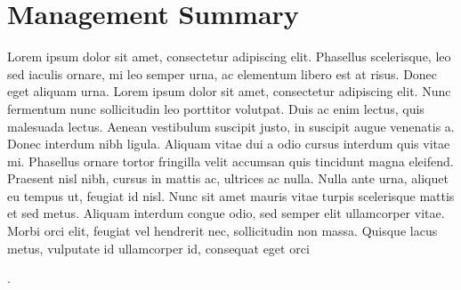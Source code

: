 \chapter*{Management Summary}
\label{chap:managementSummary}

Lorem ipsum dolor sit amet, consectetur adipiscing elit. Phasellus scelerisque, leo sed iaculis ornare, mi leo semper urna, ac elementum libero est at risus. Donec eget aliquam urna. Lorem ipsum dolor sit amet, consectetur adipiscing elit. Nunc fermentum nunc sollicitudin leo porttitor volutpat. Duis ac enim lectus, quis malesuada lectus. Aenean vestibulum suscipit justo, in suscipit augue venenatis a. Donec interdum nibh ligula. Aliquam vitae dui a odio cursus interdum quis vitae mi. Phasellus ornare tortor fringilla velit accumsan quis tincidunt magna eleifend. Praesent nisl nibh, cursus in mattis ac, ultrices ac nulla. Nulla ante urna, aliquet eu tempus ut, feugiat id nisl. Nunc sit amet mauris vitae turpis scelerisque mattis et sed metus. Aliquam interdum congue odio, sed semper elit ullamcorper vitae. Morbi orci elit, feugiat vel hendrerit nec, sollicitudin non massa. Quisque lacus metus, vulputate id ullamcorper id, consequat eget orci 

\cite{kopka:band1} 
\cite{Marti06}. 
